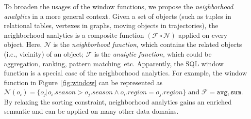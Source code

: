 To broaden the usages of the window functions, we propose the \emph{neighborhood
analytics} in a more general context. Given a set of objects 
(such as tuples in relational tables, vertexes in graphs, moving objects in trajectories),
the neighborhood analytics is a composite function
$(\mathcal{F} \circ \mathcal{N})$ applied on every object. Here, $\mathcal{N}$
is the \emph{neighborhood function}, which contains the related objects (i.e., vicinity) of an object;
$\mathcal{F}$ is the \emph{analytic function}, which could be aggregation, ranking,
pattern matching~etc.
Apparently, the SQL window function is a special case of the
neighborhood analytics. For example, the window function in Figure~\ref{fig:window} 
can be represented as $\mathcal{N}(o_i)=\{o_j | o_i.season > o_j.season \wedge o_i.region = o_j.region\}$
and $\mathcal{F} = \mathtt{avg}, \mathtt{sum}$.
By relaxing the sorting constraint, neighborhood analytics gains an enriched 
semantic and can be applied on many other data domains.

